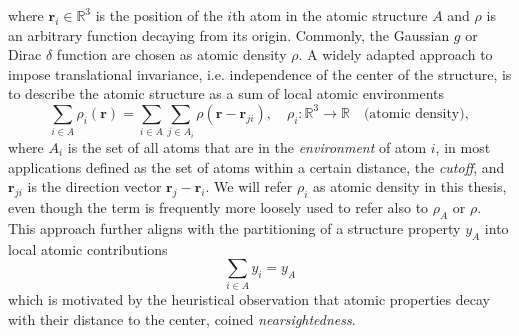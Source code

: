 where $\mathbf{r}_i\in\mathbb{R}^3$ is the position of the $i$th atom in the atomic structure $A$ and $\rho$ is an arbitrary function decaying from its origin. 
Commonly, the Gaussian $g$ or Dirac $\delta$ function are chosen as atomic density $\rho$.
A widely adapted approach to impose translational invariance, i.e. independence of the center of the structure, is to describe the atomic structure as a sum of local atomic environments
\begin{equation}
  \sum_{i\in A} \rho_i(\mathbf{r}) = \sum_{i\in A}\sum_{j\in A_i} \rho(\mathbf{r}-\mathbf{r}_{ji}),\quad \rho_i:\mathbb{R}^3\rightarrow\mathbb{R}\quad\text{(atomic density)},
\end{equation}
where $A_i$ is the set of all atoms that are in the \emph{environment} of atom
$i$, in most applications defined as the set of atoms within a certain distance, the
\emph{cutoff}, and $\mathbf{r}_{ji}$ is the direction vector $\mathbf{r}_j-\mathbf{r}_i$. 
We will refer $\rho_i$ as atomic density in this thesis, even though the term is frequently more loosely used to refer also to $\rho_A$ or $\rho$.
This approach further aligns with the partitioning of a structure property $y_A$ into local atomic contributions
\begin{equation}
  \label{eq:structural_separation}
  \sum_{i\in A} y_i = y_A
\end{equation}
which is motivated by the heuristical observation that atomic properties decay with their distance to the center, coined \emph{nearsightedness}\cite{prodan2005nearsightedness}.
